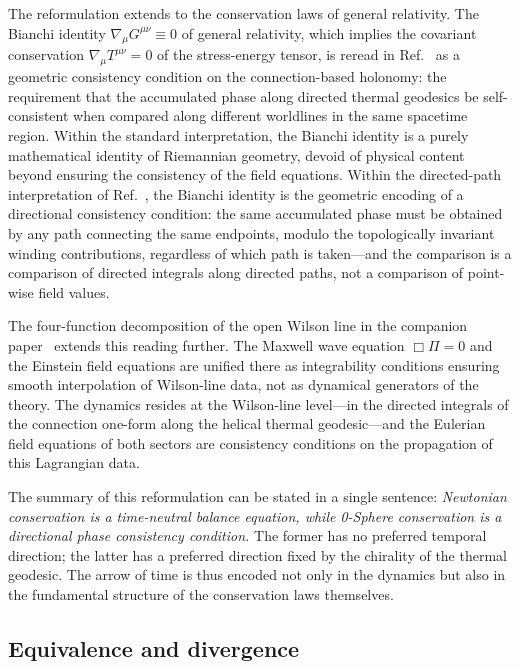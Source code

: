 \documentclass[%
 reprint, amsmath,amssymb, aps, prb, ]{revtex4-2}
\numberwithin{equation}{section}
\begin{document}
The reformulation extends to the conservation laws of general relativity. The Bianchi identity $\nabla_\mu G^{\mu\nu} \equiv 0$ of general relativity, which implies the covariant conservation $\nabla_\mu T^{\mu\nu} = 0$ of the stress-energy tensor, is reread in Ref.~\cite{hanamura30} as a geometric consistency condition on the connection-based holonomy: the requirement that the accumulated phase along directed thermal geodesics be self-consistent when compared along different worldlines in the same spacetime region. Within the standard interpretation, the Bianchi identity is a purely mathematical identity of Riemannian geometry, devoid of physical content beyond ensuring the consistency of the field equations. Within the directed-path interpretation of Ref.~\cite{hanamura30}, the Bianchi identity is the geometric encoding of a directional consistency condition: the same accumulated phase must be obtained by any path connecting the same endpoints, modulo the topologically invariant winding contributions, regardless of which path is taken---and the comparison is a comparison of directed integrals along directed paths, not a comparison of point-wise field values.

The four-function decomposition of the open Wilson line in the companion paper~\cite{hanamura55} extends this reading further. The Maxwell wave equation $\Box \Pi = 0$ and the Einstein field equations are unified there as integrability conditions ensuring smooth interpolation of Wilson-line data, not as dynamical generators of the theory. The dynamics resides at the Wilson-line level---in the directed integrals of the connection one-form along the helical thermal geodesic---and the Eulerian field equations of both sectors are consistency conditions on the propagation of this Lagrangian data.

The summary of this reformulation can be stated in a single sentence: \emph{Newtonian conservation is a time-neutral balance equation, while 0-Sphere conservation is a directional phase consistency condition.} The former has no preferred temporal direction; the latter has a preferred direction fixed by the chirality of the thermal geodesic. The arrow of time is thus encoded not only in the dynamics but also in the fundamental structure of the conservation laws themselves.

\subsection{Equivalence and divergence}
\label{sec:equivalence_divergence}
\end{document}
